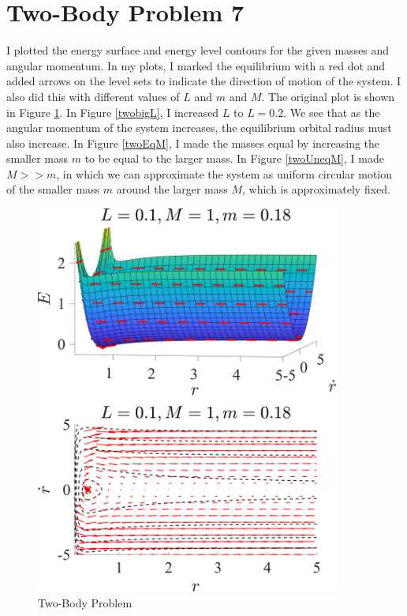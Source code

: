 \documentclass[11pt]{article}
\begin{document}
\clearpage 

\section*{Two-Body Problem 7}
I plotted the energy surface and energy level contours for the given masses and angular momentum. In my plots, I marked the equilibrium with a red dot and added arrows on the level sets to indicate the direction of motion of the system. I also did this with different values of $L$ and $m$ and $M$. The original plot is shown in Figure \ref{two}. In Figure \ref{twobigL}, I increased $L$ to $L = 0.2$. We see that as the angular momentum of the system increases, the equilibrium orbital radius must also increase. In Figure \ref{twoEqM}, I made the masses equal by increasing the smaller mass $m$ to be equal to the larger mass. In Figure \ref{twoUneqM}, I made $M >> m$, in which we can approximate the system as uniform circular motion of the smaller mass $m$ around the larger mass $M$, which is approximately fixed.

\begin{figure}[h]
\centering
\includegraphics[width=10cm]{2 Body Problem.png}
\caption{Two-Body Problem}
\label{two}
\end{figure}
\end{document}
